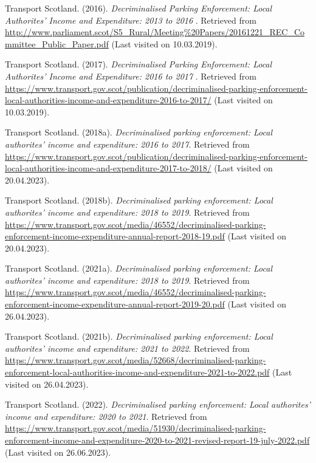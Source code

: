 \documentclass[
  12pt,
]{article}
\newlength{\cslhangindent}
\newlength{\cslentryspacingunit} %
\newenvironment{CSLReferences}[2] %
 {%
  \setlength{\parindent}{0pt}
  \ifodd #1
  \let\oldpar\par
  \def\par{\hangindent=\cslhangindent\oldpar}
  \fi
  \setlength{\parskip}{#2\cslentryspacingunit}
 }%
 {}
\begin{document}
\begin{CSLReferences}{1}{0}
\leavevmode{}%
Transport Scotland. (2016). \emph{{Decriminalised Parking Enforcement: Local Authorites' Income and Expenditure: 2013 to 2016 }}. Retrieved from \url{http://www.parliament.scot/S5_Rural/Meeting\%20Papers/20161221_REC_Committee_Public_Paper.pdf} (Last visited on 10.03.2019).

\leavevmode{}%
Transport Scotland. (2017). \emph{{Decriminalised Parking Enforcement: Local Authorites' Income and Expenditure: 2016 to 2017 }}. Retrieved from \url{https://www.transport.gov.scot/publication/decriminalised-parking-enforcement-local-authorities-income-and-expenditure-2016-to-2017/} (Last visited on 10.03.2019).

\leavevmode{}%
Transport Scotland. (2018a). \emph{Decriminalised parking enforcement: Local authorites' income and expenditure: 2016 to 2017}. Retrieved from \url{https://www.transport.gov.scot/publication/decriminalised-parking-enforcement-local-authorities-income-and-expenditure-2017-to-2018/} (Last visited on 20.04.2023).

\leavevmode{}%
Transport Scotland. (2018b). \emph{Decriminalised parking enforcement: Local authorites' income and expenditure: 2018 to 2019}. Retrieved from \url{https://www.transport.gov.scot/media/46552/decriminalised-parking-enforcement-income-expenditure-annual-report-2018-19.pdf} (Last visited on 20.04.2023).

\leavevmode{}%
Transport Scotland. (2021a). \emph{Decriminalised parking enforcement: Local authorites' income and expenditure: 2018 to 2019}. Retrieved from \url{https://www.transport.gov.scot/media/46552/decriminalised-parking-enforcement-income-expenditure-annual-report-2019-20.pdf} (Last visited on 26.04.2023).

\leavevmode{}%
Transport Scotland. (2021b). \emph{Decriminalised parking enforcement: Local authorites' income and expenditure: 2021 to 2022}. Retrieved from \url{https://www.transport.gov.scot/media/52668/decriminalised-parking-enforcement-local-authorities-income-and-expenditure-2021-to-2022.pdf} (Last visited on 26.04.2023).

\leavevmode{}%
Transport Scotland. (2022). \emph{Decriminalised parking enforcement: Local authorites' income and expenditure: 2020 to 2021}. Retrieved from \url{https://www.transport.gov.scot/media/51930/decriminalised-parking-enforcement-income-and-expenditure-2020-to-2021-revised-report-19-july-2022.pdf} (Last visited on 26.06.2023).


\end{CSLReferences}
\end{document}
